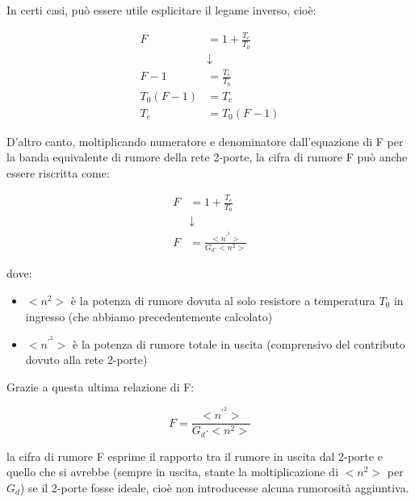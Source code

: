In certi casi, può essere utile esplicitare il legame inverso, cioè: 

{
    \Large 
    \begin{equation}
        \begin{split}
        F &= 1 + \frac{T_e}{T_0}
        \\
        &\downarrow
        \\
        F - 1
        &= 
        \frac{T_e}{T_0}
        \\
        T_0 (F - 1)
        &=
        T_e 
        \\
        T_e 
        &=
        T_0 (F - 1)
        \end{split}
    \end{equation}
}

D'altro canto, moltiplicando numeratore e denominatore dall'equazione di F per la banda equivalente di rumore della rete 2-porte, 
la cifra di rumore F può anche essere riscritta come: 

{
    \Large 
    \begin{equation}
        \begin{split}
           F &= 1 + \frac{T_e}{T_0} 
           \\
           &\downarrow
           \\
           F &= \frac{<n^{'^{2}}>}{G_d \cdot <n^{2}>}
        \end{split}
    \end{equation}
}


dove: 

\begin{itemize}
    \item $<n^{2}>$ è la potenza di rumore dovuta al solo resistore a temperatura $T_0$ in ingresso (che abbiamo precedentemente calcolato) 
    \item $<n^{'^{2}}>$ è la potenza di rumore totale in uscita (comprensivo del contributo dovuto alla rete 2-porte)
\end{itemize}

Grazie a questa ultima relazione di F: 

{
    \Large 
    \begin{equation}
        F = \frac{<n^{'^{2}}>}{G_d \cdot <n^{2}>}
    \end{equation}
}

la cifra di rumore F esprime il rapporto tra il rumore in uscita dal 2-porte 
e quello che si avrebbe (sempre in uscita, stante la moltiplicazione di $<n^{2}>$ per $G_d$) 
se il 2-porte fosse ideale, cioè non introducesse alcuna rumorosità aggiuntiva. \newline 

